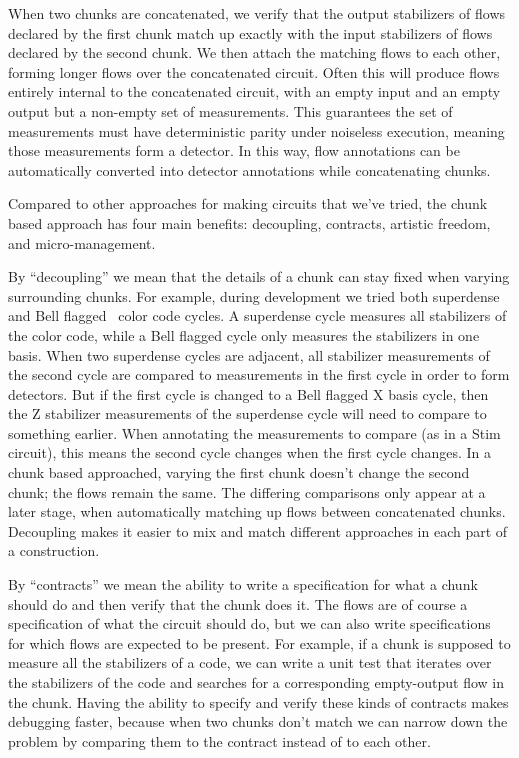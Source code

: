 \documentclass[onecolumn,unpublished,a4paper]{quantumarticle}
\theoremstyle{definition}
\begin{document}
When two chunks are concatenated, we verify that the output stabilizers of flows declared by the first chunk match up exactly with the input stabilizers of flows declared by the second chunk.
We then attach the matching flows to each other, forming longer flows over the concatenated circuit.
Often this will produce flows entirely internal to the concatenated circuit, with an empty input and an empty output but a non-empty set of measurements.
This guarantees the set of measurements must have deterministic parity under noiseless execution, meaning those measurements form a detector.
In this way, flow annotations can be automatically converted into detector annotations while concatenating chunks.

Compared to other approaches for making circuits that we've tried, the chunk based approach has four main benefits: decoupling, contracts, artistic freedom, and micro-management.

By ``decoupling'' we mean that the details of a chunk can stay fixed when varying surrounding chunks.
For example, during development we tried both superdense~\cite{gidney2023colorcode} and Bell flagged~\cite{baireuther2019bellflaggedcolor} color code cycles.
A superdense cycle measures all stabilizers of the color code, while a Bell flagged cycle only measures the stabilizers in one basis.
When two superdense cycles are adjacent, all stabilizer measurements of the second cycle are compared to measurements in the first cycle in order to form detectors.
But if the first cycle is changed to a Bell flagged X basis cycle, then the Z stabilizer measurements of the superdense cycle will need to compare to something earlier.
When annotating the measurements to compare (as in a Stim circuit), this means the second cycle changes when the first cycle changes.
In a chunk based approached, varying the first chunk doesn't change the second chunk; the flows remain the same.
The differing comparisons only appear at a later stage, when automatically matching up flows between concatenated chunks.
Decoupling makes it easier to mix and match different approaches in each part of a construction.

By ``contracts'' we mean the ability to write a specification for what a chunk should do and then verify that the chunk does it.
The flows are of course a specification of what the circuit should do, but we can also write specifications for which flows are expected to be present.
For example, if a chunk is supposed to measure all the stabilizers of a code, we can write a unit test that iterates over the stabilizers of the code and searches for a corresponding empty-output flow in the chunk.
Having the ability to specify and verify these kinds of contracts makes debugging faster, because when two chunks don't match we can narrow down the problem by comparing them to the contract instead of to each other.
\end{document}
